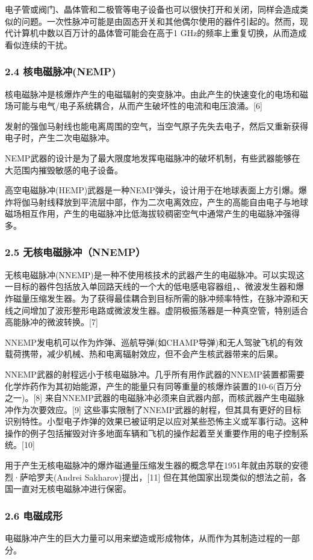 电子管或阀门、晶体管和二极管等电子设备也可以很快打开和关闭，同样会造成类似的问题。一次性脉冲可能是由固态开关和其他偶尔使用的器件引起的。然而，现代计算机中数以百万计的晶体管可能会在高于1 GHz的频率上重复切换，从而造成看似连续的干扰。
\subsubsection{2.4 核电磁脉冲(NEMP)}
核电磁脉冲是核爆炸产生的电磁辐射的突变脉冲。由此产生的快速变化的电场和磁场可能与电气/电子系统耦合，从而产生破坏性的电流和电压浪涌。[6]

发射的强伽马射线也能电离周围的空气，当空气原子先失去电子，然后又重新获得电子时，产生二次电磁脉冲。

NEMP武器的设计是为了最大限度地发挥电磁脉冲的破坏机制，有些武器能够在大范围内摧毁敏感的电子设备。

高空电磁脉冲(HEMP)武器是一种NEMP弹头，设计用于在地球表面上方引爆。爆炸将伽马射线释放到平流层中部，作为二次电离效应，产生的高能自由电子与地球磁场相互作用，产生的电磁脉冲比低海拔较稠密空气中通常产生的电磁脉冲强得多。
\subsubsection{2.5 无核电磁脉冲（NNEMP）}
无核电磁脉冲(NNEMP)是一种不使用核技术的武器产生的电磁脉冲。可以实现这一目标的器件包括放入单回路天线的一个大的低电感电容器组，、微波发生器和爆炸磁量压缩发生器。为了获得最佳耦合到目标所需的脉冲频率特性，在脉冲源和天线之间增加了波形整形电路或微波发生器。虚阴极振荡器是一种真空管，特别适合高能脉冲的微波转换。[7]

NNEMP发电机可以作为炸弹、巡航导弹(如CHAMP导弹)和无人驾驶飞机的有效载荷携带，减少机械、热和电离辐射效应，但不会产生核武器带来的后果。

NNEMP武器的射程远小于核电磁脉冲。几乎所有用作武器的NNEMP装置都需要化学炸药作为其初始能源，产生的能量只有同等重量的核爆炸装置的10-6(百万分之一)。[8] 来自NNEMP武器的电磁脉冲必须来自武器内部，而核武器产生电磁脉冲作为次要效应。[9] 这些事实限制了NNEMP武器的射程，但其具有更好的目标识别特性。小型电子炸弹的效果已被证明足以应对某些恐怖主义或军事行动。这种操作的例子包括摧毁对许多地面车辆和飞机的操作起着至关重要作用的电子控制系统。[10]

用于产生无核电磁脉冲的爆炸磁通量压缩发生器的概念早在1951年就由苏联的安德烈·萨哈罗夫(Andrei Sakharov)提出，[11] 但在其他国家出现类似的想法之前，各国一直对无核电磁脉冲进行保密。
\subsubsection{2.6 电磁成形}
电磁脉冲产生的巨大力量可以用来塑造或形成物体，从而作为其制造过程的一部分。

